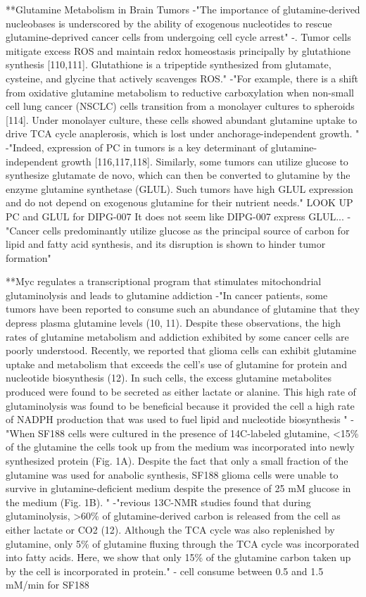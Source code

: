 \documentclass[11pt,a4paper]{article}
\begin{document}
**Glutamine Metabolism in Brain Tumors
-"The importance of glutamine-derived nucleobases is underscored by the ability of exogenous nucleotides to rescue glutamine-deprived cancer cells from undergoing cell cycle arrest"
-. Tumor cells mitigate excess ROS and maintain redox homeostasis principally by glutathione synthesis [110,111]. Glutathione is a tripeptide synthesized from glutamate, cysteine, and glycine that actively scavenges ROS."
-"For example, there is a shift from oxidative glutamine metabolism to reductive carboxylation when non-small cell lung cancer (NSCLC) cells transition from a monolayer cultures to spheroids [114]. Under monolayer culture, these cells showed abundant glutamine uptake to drive TCA cycle anaplerosis, which is lost under anchorage-independent growth. "
-"Indeed, expression of PC in tumors is a key determinant of glutamine-independent growth [116,117,118]. Similarly, some tumors can utilize glucose to synthesize glutamate de novo, which can then be converted to glutamine by the enzyme glutamine synthetase (GLUL). Such tumors have high GLUL expression and do not depend on exogenous glutamine for their nutrient needs." LOOK UP PC and GLUL for DIPG-007 It does not seem like DIPG-007 express GLUL...
-"Cancer cells predominantly utilize glucose as the principal source of carbon for lipid and fatty acid synthesis, and its disruption is shown to hinder tumor formation"


**Myc regulates a transcriptional program that stimulates mitochondrial glutaminolysis and leads to glutamine addiction
-"In cancer patients, some tumors have been reported to consume such an abundance of glutamine that they depress plasma glutamine levels (10, 11). Despite these observations, the high rates of glutamine metabolism and addiction exhibited by some cancer cells are poorly understood. Recently, we reported that glioma cells can exhibit glutamine uptake and metabolism that exceeds the cell's use of glutamine for protein and nucleotide biosynthesis (12). In such cells, the excess glutamine metabolites produced were found to be secreted as either lactate or alanine. This high rate of glutaminolysis was found to be beneficial because it provided the cell a high rate of NADPH production that was used to fuel lipid and nucleotide biosynthesis "
-"When SF188 cells were cultured in the presence of 14C-labeled glutamine, <15\% of the glutamine the cells took up from the medium was incorporated into newly synthesized protein (Fig. 1A). Despite the fact that only a small fraction of the glutamine was used for anabolic synthesis, SF188 glioma cells were unable to survive in glutamine-deficient medium despite the presence of 25 mM glucose in the medium (Fig. 1B). "
-"revious 13C-NMR studies found that during glutaminolysis, >60\% of glutamine-derived carbon is released from the cell as either lactate or CO2 (12). Although the TCA cycle was also replenished by glutamine, only 5\% of glutamine fluxing through the TCA cycle was incorporated into fatty acids. Here, we show that only 15\% of the glutamine carbon taken up by the cell is incorporated in protein."
- cell consume between 0.5 and 1.5 mM/min for SF188
\end{document}
